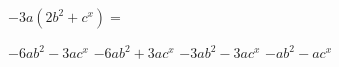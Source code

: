 
\question $-3a(2b^2 + c^x) = $

  \begin{oneparchoices}
    \CorrectChoice $-6ab^2 - 3ac^x$
    \choice $-6ab^2 + 3ac^x$
    \choice $-3ab^2 - 3ac^x$
    \choice $-ab^2 - ac^x$
  \end{oneparchoices}
